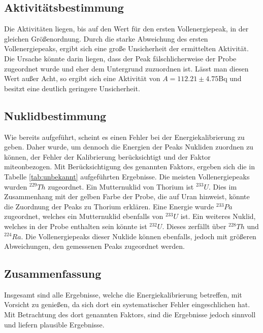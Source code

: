 \subsection{Aktivitätsbestimmung}
Die Aktivitäten liegen, bis auf den Wert für den ersten Vollenergiepeak, in der gleichen Größenordnung.
Durch die starke Abweichung des ersten Vollenergiepeaks, ergibt sich eine große Unsicherheit der ermittelten Aktivität.
Die Ursache könnte darin liegen, dass der Peak fälschlicherweise der Probe zugeordnet wurde und eher dem Untergrund zuzuordnen ist.
Lässt man diesen Wert außer Acht, so ergibt sich eine Aktivität von $A = 112.21 \pm 4.75 \si{\becquerel}$ und besitzt eine deutlich geringere Unsicherheit.

\subsection{Nuklidbestimmung}
Wie bereits aufgeführt, scheint es einen Fehler bei der Energiekalibrierung zu geben.
Daher wurde, um dennoch die Energien der Peaks Nukliden zuordnen zu können, der Fehler der Kalibrierung berücksichtigt und der Faktor miteonbezogen.
Mit Berücksichtigung des genannten Faktors, ergeben sich die in Tabelle \ref{tab:unbekannt} aufgeführten Ergebnisse.
Die meisten Vollenergiepeaks wurden $^{229}Th$ zugeordnet. Ein Mutternuklid von Thorium ist $^{233}U$.
Dies im Zusammenhang mit der gelben Farbe der Probe, die auf Uran hinweist, könnte die Zuordnung der Peaks zu Thorium erklären.
Eine Energie wurde $^{233}Pa$ zugeordnet, welches ein Mutternuklid ebenfalls von $^{233}U$ ist.
Ein weiteres Nuklid, welches in der Probe enthalten sein könnte ist $^{232}U$.
Dieses zerfällt über $^{228}Th$ und $^{224}Ra$. Die Vollenergiepeaks dieser Nuklide können ebenfalls, jedoch mit größeren Abweichungen, den gemessenen Peaks zugeordnet werden.

\subsection{Zusammenfassung}
Insgesamt sind alle Ergebnisse, welche die Energiekalibrierung betreffen, mit Vorsicht zu genießen, da sich dort ein systematischer Fehler eingeschlichen hat.
Mit Betrachtung des dort genannten Faktors, sind die Ergebnisse jedoch sinnvoll und liefern plausible Ergebnisse.

